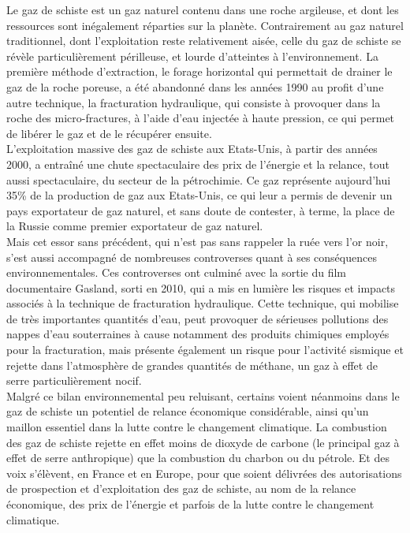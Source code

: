 \documentclass[8pt]{article}
\begin{document}
Le gaz de schiste est un gaz naturel contenu dans une roche argileuse, et dont les ressources sont inégalement réparties sur la planète. Contrairement au gaz naturel traditionnel, dont l’exploitation reste relativement aisée, celle du gaz de schiste se révèle particulièrement périlleuse, et lourde d’atteintes à l’environnement. La première méthode d’extraction, le forage horizontal qui permettait de drainer le gaz de la roche poreuse, a été abandonné dans les années 1990 au profit d’une autre technique, la fracturation hydraulique, qui consiste à provoquer dans la roche des micro-fractures, à l’aide d’eau injectée à haute pression, ce qui permet de libérer le gaz et de le récupérer ensuite.  \\

L’exploitation massive des gaz de schiste aux Etats-Unis, à partir des années 2000, a entraîné une chute spectaculaire des prix de l’énergie et la relance, tout aussi spectaculaire, du secteur de la pétrochimie. Ce gaz représente aujourd’hui 35\% de la production de gaz aux Etats-Unis, ce qui leur a permis de devenir un pays exportateur de gaz naturel, et sans doute de contester, à terme, la place de la Russie comme premier exportateur de gaz naturel.  \\

Mais cet essor sans précédent, qui n’est pas sans rappeler la ruée vers l’or noir, s’est aussi accompagné de nombreuses controverses quant à ses conséquences environnementales. Ces controverses ont culminé avec la sortie du film documentaire Gasland, sorti en 2010, qui a mis en lumière les risques et impacts associés à la technique de fracturation hydraulique. Cette technique, qui mobilise de très importantes quantités d’eau, peut provoquer de sérieuses pollutions des nappes d’eau souterraines à cause notamment des produits chimiques employés pour la fracturation, mais présente également un risque pour l’activité sismique et rejette dans l’atmosphère de grandes quantités de méthane, un gaz à effet de serre particulièrement nocif.  \\

Malgré ce bilan environnemental peu reluisant, certains voient néanmoins dans le gaz de schiste un potentiel de relance économique considérable, ainsi qu’un maillon essentiel dans la lutte contre le changement climatique. La combustion des gaz de schiste rejette en effet moins de dioxyde de carbone (le principal gaz à effet de serre anthropique) que la combustion du charbon ou du pétrole. Et des voix s’élèvent, en France et en Europe, pour que soient délivrées des autorisations de prospection et d’exploitation des gaz de schiste, au nom de la relance économique, des prix de l’énergie et parfois de la lutte contre le changement climatique. \\ 
\end{document}
